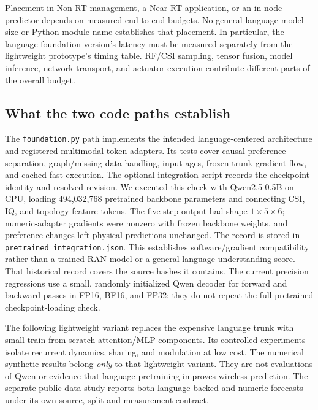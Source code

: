 Placement in Non-RT management, a Near-RT application, or an in-node predictor
depends on measured end-to-end budgets. No general language-model size or Python
module name establishes that placement. In particular, the language-foundation
version's latency must be measured separately from the lightweight prototype's
timing table. RF/CSI sampling, tensor fusion, model inference, network transport,
and actuator execution contribute different parts of the overall budget.

\subsection{What the two code paths establish}
The \texttt{foundation.py} path implements the intended language-centered
architecture and registered multimodal token adapters. Its tests cover causal
preference separation, graph/missing-data handling, input ages, frozen-trunk
gradient flow, and cached fast execution. The optional integration script records
the checkpoint identity and resolved revision. We executed this check with
Qwen2.5-0.5B on CPU, loading 494,032,768 pretrained backbone parameters and
connecting CSI, IQ, and topology feature tokens. The five-step output had shape
$1\times5\times6$; numeric-adapter gradients were nonzero with frozen backbone
weights, and preference changes left physical predictions unchanged. The record
is stored in \texttt{pretrained\_integration.json}. This establishes
software/gradient compatibility rather than a trained RAN model or a general
language-understanding score.
That historical record covers the source hashes it contains. The current
precision regressions use a small, randomly initialized Qwen decoder for forward
and backward passes in FP16, BF16, and FP32; they do not repeat the full pretrained
checkpoint-loading check.

The following lightweight variant replaces the expensive language trunk with
small train-from-scratch attention/MLP components. Its controlled experiments
isolate recurrent dynamics, sharing, and modulation at low cost. The numerical
synthetic results belong \emph{only} to that lightweight variant.
They are not evaluations of Qwen or evidence that language pretraining improves
wireless prediction. The separate public-data study reports both language-backed
and numeric forecasts under its own source, split and measurement contract.

